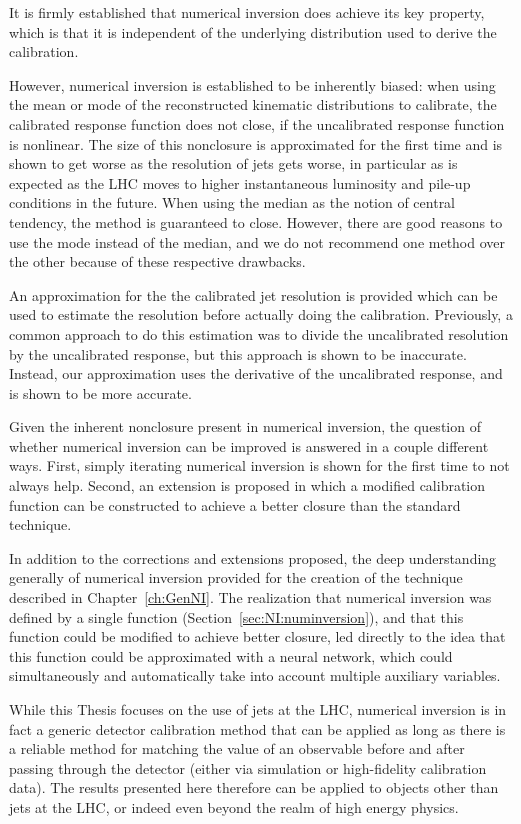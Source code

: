 It is firmly established that numerical inversion does achieve its key property, which is that it is independent of the underlying distribution used to derive the calibration.

However, numerical inversion is established to be inherently biased: when using the mean or mode of the reconstructed kinematic distributions to calibrate, the calibrated response function does not close, if the uncalibrated response function is nonlinear.
The size of this nonclosure is approximated for the first time and is shown to get worse as the resolution of jets gets worse, in particular as is expected as the LHC moves to higher instantaneous luminosity and pile-up conditions in the future.
When using the median as the notion of central tendency, the method is guaranteed to close.
However, there are good reasons to use the mode instead of the median, and we do not recommend one method over the other because of these respective drawbacks.

An approximation for the the calibrated jet resolution is provided which can be used to estimate the resolution before actually doing the calibration.
Previously, a common approach to do this estimation was to divide the uncalibrated resolution by the uncalibrated response, but this approach is shown to be inaccurate.
Instead, our approximation uses the derivative of the uncalibrated response, and is shown to be more accurate.

Given the inherent nonclosure present in numerical inversion, the question of whether numerical inversion can be improved is answered in a couple different ways. 
First, simply iterating numerical inversion is shown for the first time to not always help.
Second, an extension is proposed in which a modified calibration function can be constructed to achieve a better closure than the standard technique.

In addition to the corrections and extensions proposed, the deep understanding generally of numerical inversion provided for the creation of the technique described in Chapter~\ref{ch:GenNI}.
The realization that numerical inversion was defined by a single function (Section~\ref{sec:NI:numinversion}), and that this function could be modified to achieve better closure, led directly to the idea that this function could be approximated with a neural network, which could simultaneously and automatically take into account multiple auxiliary variables.

While this Thesis focuses on the use of jets at the LHC, numerical inversion is in fact a generic detector calibration method that can be applied as long as there is a reliable method for matching the value of an observable before and after passing through the detector (either via simulation or high-fidelity calibration data).
The results presented here therefore can be applied to objects other than jets at the LHC, or indeed even beyond the realm of high energy physics.

\clearpage
\newpage
